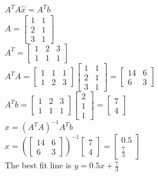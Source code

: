 \documentclass{article}
\begin{document}
$A^TA\hat{x} = A^T b$ \\
$A = \begin{bmatrix}1 & 1 \\ 2 & 1 \\ 3 & 1\end{bmatrix}$ \\
$A^T = \begin{bmatrix}1 & 2 & 3 \\ 1 & 1 & 1\end{bmatrix}$ \\
$A^TA = \begin{bmatrix}1 & 1 & 1 \\ 1 & 2 & 3\end{bmatrix}\begin{bmatrix}1 & 1 \\ 2 & 1 \\ 3 & 1\end{bmatrix} = \begin{bmatrix}14 & 6 \\ 6 & 3\end{bmatrix}$ \\
$A^Tb = \begin{bmatrix}1 & 2 & 3 \\ 1 & 1 & 1\end{bmatrix}\begin{bmatrix}2 \\ 1 \\ 1\end{bmatrix} = \begin{bmatrix}7 \\ 4\end{bmatrix}$ \\
$\hat{x} = (A^TA)^{-1}A^Tb$ \\
$\hat{x} = (\begin{bmatrix}14 & 6 \\ 6 & 3\end{bmatrix})^{-1}\begin{bmatrix}7 \\ 4\end{bmatrix} = \begin{bmatrix}0.5 \\ \frac{7}{3}\end{bmatrix}$ \\
The best fit line is $y = 0.5x + \frac{7}{3}$
\end{document}
